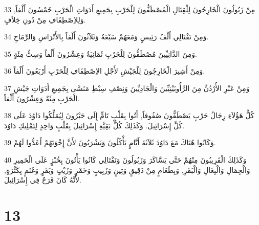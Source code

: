 \par 33 مِنْ زَبُولُونَ الْخَارِجُونَ لِلْقِتَالِ الْمُصْطَفُّونَ لِلْحَرْبِ بِجَمِيعِ أَدَوَاتِ الْحَرْبِ خَمْسُونَ أَلْفاً, وَلِلاِصْطِفَافِ مِنْ دُونِ خِلاَفٍ.
\par 34 وَمِنْ نَفْتَالِي أَلْفُ رَئِيسٍ وَمَعَهُمْ سَبْعَةٌ وَثَلاَثُونَ أَلْفاً بِالأَتْرَاسِ وَالرِّمَاحِ.
\par 35 وَمِنَ الدَّانِيِّينَ مُصْطَفُّونَ لِلْحَرْبِ ثَمَانِيَةٌ وَعِشْرُونَ أَلْفاً وَسِتُّ مِئَةٍ.
\par 36 وَمِنْ أَشِيرَ الْخَارِجُونَ لِلْجَيْشِ لأَجْلِ الاِصْطِفَافِ لِلْحَرْبِ أَرْبَعُونَ أَلْفاً.
\par 37 وَمِنْ عَبْرِ الأُرْدُنِّ مِنَ الرَّأُوبَيْنِيِّينَ وَالْجَادِيِّينَ وَنِصْفِ سِبْطِ مَنَسَّى بِجَمِيعِ أَدَوَاتِ جَيْشِ الْحَرْبِ مِئَةٌ وَعِشْرُونَ أَلْفاً.
\par 38 كُلُّ هَؤُلاَءِ رِجَالُ حَرْبٍ يَصْطَفُّونَ صُفُوفاً, أَتُوا بِقَلْبٍ تَامٍّ إِلَى حَبْرُونَ لِيُمَلِّكُوا دَاوُدَ عَلَى كُلِّ إِسْرَائِيلَ. وَكَذَلِكَ كُلُّ بَقِيَّةِ إِسْرَائِيلَ بِقَلْبٍ وَاحِدٍ لِتَمْلِيكِ دَاوُدَ.
\par 39 وَكَانُوا هُنَاكَ مَعَ دَاوُدَ ثَلاَثَةَ أَيَّامٍ يَأْكُلُونَ وَيَشْرَبُونَ لأَنَّ إِخْوَتَهُمْ أَعَدُّوا لَهُمْ.
\par 40 وَكَذَلِكَ الْقَرِيبُونَ مِنْهُمْ حَتَّى يَسَّاكَرَ وَزَبُولُونَ وَنَفْتَالِي كَانُوا يَأْتُونَ بِخُبْزٍ عَلَى الْحَمِيرِ وَالْجِمَالِ وَالْبِغَالِ وَالْبَقَرِ, وَبِطَعَامٍ مِنْ دَقِيقٍ وَتِينٍ وَزَبِيبٍ وَخَمْرٍ وَزَيْتٍ وَبَقَرٍ وَغَنَمٍ بِكَثْرَةٍ, لأَنَّهُ كَانَ فَرَحٌ فِي إِسْرَائِيلَ.

\chapter{13}

